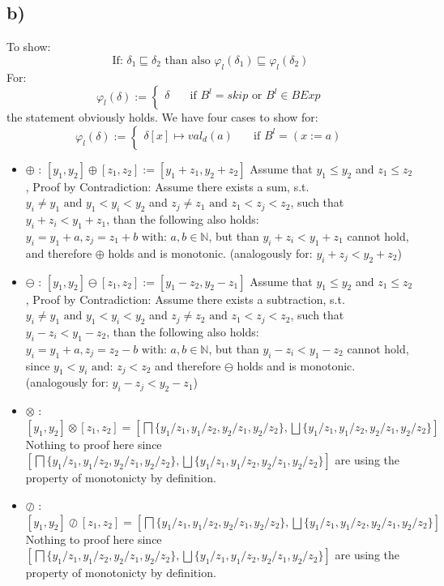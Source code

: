 \documentclass[fleqn,12pt]{article}
\begin{document}
\subsection*{b)}
To show:
$$\text{If: }\delta_1 \sqsubseteq \delta_2 \text{ than also } \varphi_l(\delta_1) \sqsubseteq \varphi_l(\delta_2)$$
For:
\[ \varphi_l(\delta) :=
  \begin{cases}
    \delta       & \quad \text{if } B^l = skip \text{ or } B^l \in BExp\\
  \end{cases}
\]
the statement obviously holds.
We have four cases to show for:
\[ \varphi_l(\delta) :=
  \begin{cases}
    \delta [x] \mapsto val_d(a) & \quad \text{if } B^l=(x:=a)\\
  \end{cases}
\]
\begin{itemize}
	\item{$\oplus$ :} $[y_1,y_2] \oplus [z_1,z_2] := [y_1+z_1,y_2+z_2]$ Assume that $y_1 \leq y_2$ and $z_1 \leq z_2$, Proof by Contradiction: Assume there exists a sum, s.t. $y_i \neq y_1 \text{ and } y_1<y_i<y_2$ and $z_j \neq z_1 \text{ and } z_1<z_j<z_2$, such that $y_i+z_i<y_1+z_1$, than the following also holds: $y_i=y_1+a,z_j=z_1+b \text{ with: } a,b\in \mathbb{N}$, but than $y_i+z_i<y_1+z_1$ cannot hold, and therefore $\oplus$ holds and is monotonic. (analogously for: $y_i+z_j<y_2+z_2$)
	\item{$\ominus$ :} $[y_1,y_2] \ominus [z_1,z_2] := [y_1-z_2,y_2-z_1]$ Assume that $y_1 \leq y_2$ and $z_1 \leq z_2$, Proof by Contradiction: Assume there exists a subtraction, s.t. $y_i \neq y_1 \text{ and } y_1<y_i<y_2$ and $z_j \neq z_2 \text{ and } z_1<z_j<z_2$, such that $y_i-z_i<y_1-z_2$, than the following also holds: $y_i=y_1+a,z_j=z_2-b \text{ with: } a,b\in \mathbb{N}$, but than $y_i-z_i<y_1-z_2$ cannot hold, since $y_1<y_i \text{ and: } z_j<z_2$ and therefore $\ominus$ holds and is monotonic. (analogously for: $y_i-z_j<y_2-z_1$)
	\item{$\otimes$ :} $[y_1,y_2] \otimes [z_1,z_2]=[\bigsqcap\{y_1/z_1,y_1/z_2,y_2/z_1,y_2/z_2\},\bigsqcup\{y_1/z_1,y_1/z_2,y_2/z_1,y_2/z_2\}]$ Nothing to proof here since $[\bigsqcap\{y_1/z_1,y_1/z_2,y_2/z_1,y_2/z_2\},\bigsqcup\{y_1/z_1,y_1/z_2,y_2/z_1,y_2/z_2\}]$ are using the property of monotonicty by definition.
	\item{$\oslash$ :} $[y_1,y_2] \oslash [z_1,z_2]=[\bigsqcap\{y_1/z_1,y_1/z_2,y_2/z_1,y_2/z_2\},\bigsqcup\{y_1/z_1,y_1/z_2,y_2/z_1,y_2/z_2\}]$ Nothing to proof here since $[\bigsqcap\{y_1/z_1,y_1/z_2,y_2/z_1,y_2/z_2\},\bigsqcup\{y_1/z_1,y_1/z_2,y_2/z_1,y_2/z_2\}]$ are using the property of monotonicty by definition.
\end{itemize}
\end{document}
